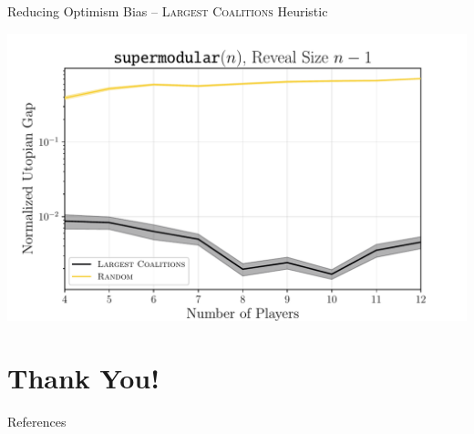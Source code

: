 \documentclass[aspectratio=169]{beamer}
\begin{document}
\begin{frame}{Reducing Optimism Bias -- \textsc{Largest Coalitions} Heuristic}
	\begin{center}
		\includegraphics[width=.8\textwidth]{figures/convex_linear.pdf}
	\end{center}
\end{frame}

\section{Thank You!}

\appendix

\begin{frame}[allowframebreaks]{References}
    \nocite{*}
    \printbibliography[heading=none]
\end{frame}
\end{document}
